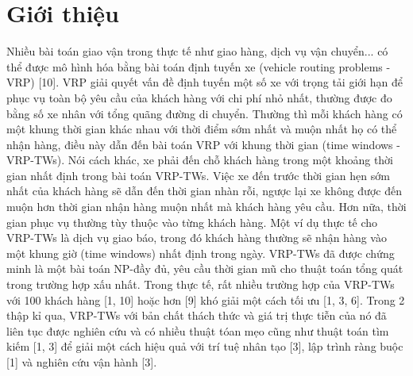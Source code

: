 \chapter{Giới thiệu}
Nhiều bài toán giao vận trong thực tế như giao hàng, dịch vụ vận chuyển... có thể được mô hình hóa bằng bài toán định tuyến xe (vehicle routing problems - VRP) [10]. VRP giải quyết vấn đề định tuyến một số xe với trọng tải giới hạn để phục vụ toàn bộ yêu cầu của khách hàng với chi phí nhỏ nhất, thường được đo bằng số xe nhân với tổng quãng đường di chuyển. Thường thì mỗi khách hàng có một khung thời gian khác nhau với thời điểm sớm nhất và muộn nhất họ có thể nhận hàng, điều này dẫn đến bài toán VRP với khung thời gian (time windows - VRP-TWs). Nói cách khác, xe phải đến chỗ khách hàng trong một khoảng thời gian nhất định trong bài toán VRP-TWs. Việc xe đến trước thời gian hẹn sớm nhất của khách hàng sẽ dẫn đến thời gian nhàn rỗi, ngược lại xe không được đến muộn hơn thời gian nhận hàng muộn nhất mà khách hàng yêu cầu. Hơn nữa, thời gian phục vụ thường tùy thuộc vào từng khách hàng. Một ví dụ thực tế cho VRP-TWs là dịch vụ giao báo, trong đó khách hàng thường sẽ nhận hàng vào một khung giờ (time windows) nhất định trong ngày. VRP-TWs đã được chứng minh là một bài toán NP-đầy đủ, yêu cầu thời gian mũ cho thuật toán tổng quát trong trường hợp xấu nhất. Trong thực tế, rất nhiều trường hợp của VRP-TWs với 100 khách hàng [1, 10] hoặc hơn [9] khó giải một cách tối ưu [1, 3, 6]. Trong 2 thập kỉ qua, VRP-TWs với bản chất thách thức và giá trị thực tiễn của nó đã liên tục được nghiên cứu và có nhiều thuật tóan mẹo cũng như thuật toán tìm kiếm [1, 3] để giải một cách hiệu quả với trí tuệ nhân tạo [3], lập trình ràng buộc [1] và nghiên cứu vận hành [3].


